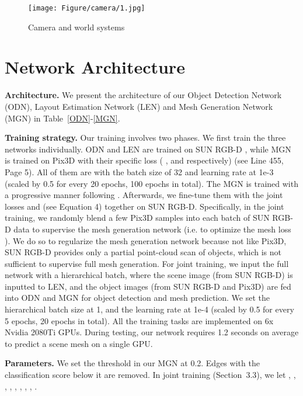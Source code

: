 \documentclass[10pt,twocolumn,letterpaper]{article}
\begin{document}
\begin{figure}[!ht]
	\centering
	\texttt{[image: Figure/camera/1.jpg]}
	\caption{Camera and world systems}
	\label{fig:camera}
\end{figure}


\section{Network Architecture}
\noindent\textbf{Architecture.} We present the architecture of our Object Detection Network (ODN), Layout Estimation Network (LEN) and Mesh Generation Network (MGN) in Table~\ref{ODN}-\ref{MGN}. 

\noindent\textbf{Training strategy.} Our training involves two phases. We first train the three networks individually. ODN and LEN are trained on SUN RGB-D \cite{song2015sun}, while MGN is trained on Pix3D \cite{sun2018pix3d} with their specific loss ( ,  and  respectively) (see Line 455, Page 5). All of them are with the batch size of 32 and learning rate at 1e-3 (scaled by 0.5 for every 20 epochs, 100 epochs in total). The MGN is trained with a progressive manner following \cite{Junyi}.  Afterwards, we fine-tune them with the joint losses  and  (see Equation 4) together on SUN RGB-D. Specifically, in the joint training, we randomly blend a few Pix3D samples into each batch of SUN RGB-D data to supervise the mesh generation network (i.e. to optimize the mesh loss ). We do so to regularize the mesh generation network because not like Pix3D, SUN RGB-D provides only a partial point-cloud scan of objects, which is not sufficient to supervise full mesh generation. For joint training, we input the full network with a hierarchical batch, where the scene image (from SUN RGB-D) is inputted to LEN, and the object images (from SUN RGB-D and Pix3D) are fed into ODN and MGN for object detection and mesh prediction. We set the hierarchical batch size at 1, and the learning rate at 1e-4 (scaled by 0.5 for every 5 epochs, 20 epochs in total). All the training tasks are implemented on 6x Nvidia 2080Ti GPUs. During testing, our network requires 1.2 seconds on average to predict a scene mesh on a single GPU. 

\noindent\textbf{Parameters.} We set the threshold in our MGN at 0.2. Edges with the classification score below it are removed. In joint training (Section~3.3), we let , , , , , , , , .
\end{document}

